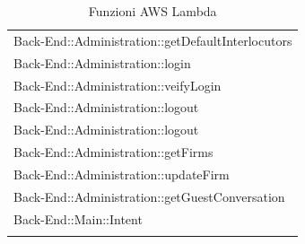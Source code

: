 \documentclass[../DefinizioneDiProdotto.tex]{subfiles}
\begin{document}
\begin{longtable}[c] { >{\centering\arraybackslash}p{10cm} }
		 		\addlinespace[0.3em]
				\midrule
				Back-End::Administration::getDefaultInterlocutors  \\
		 		\addlinespace[0.3em]
				\midrule
				Back-End::Administration::login  \\
		 		\addlinespace[0.3em]
				\midrule
				Back-End::Administration::veifyLogin  \\
		 		\addlinespace[0.3em]
				\midrule
				Back-End::Administration::logout  \\
		 		\addlinespace[0.3em]
				\midrule
				Back-End::Administration::logout \\
		 		\addlinespace[0.3em]
				\midrule
				Back-End::Administration::getFirms  \\
		 		\addlinespace[0.3em]
				\midrule
				Back-End::Administration::updateFirm\\
		 		\addlinespace[0.3em]
				\midrule
				Back-End::Administration::getGuestConversation  \\
		 		\addlinespace[0.3em]
				\midrule
				Back-End::Main::Intent  \\
		 		\addlinespace[0.3em]

				\bottomrule
				\caption{Funzioni AWS Lambda}
			\end{longtable}
\end{document}
